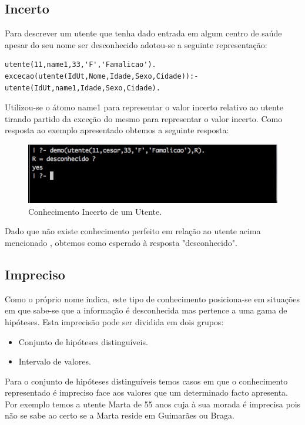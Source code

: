 \documentclass[25pt]{article}
\begin{document}
\subsection{Incerto}
Para descrever um utente que tenha dado entrada em algum centro de saúde apesar do seu nome ser desconhecido adotou-se a seguinte representação:
\begin{lstlisting}
utente(11,name1,33,'F','Famalicao').
excecao(utente(IdUt,Nome,Idade,Sexo,Cidade)):- 
utente(IdUt,name1,Idade,Sexo,Cidade).
\end{lstlisting}

Utilizou-se o átomo name1 para representar o valor incerto relativo ao utente tirando partido da exceção do mesmo para representar o valor incerto.\newline
Como resposta ao exemplo apresentado obtemos a seguinte resposta:

\begin{figure}[H]
\centering\includegraphics[scale=0.55]{incerto}
\caption{\label{fig:controller}Conhecimento Incerto de um Utente.}
\end{figure}

Dado que não existe conhecimento perfeito em relação ao utente acima mencionado , obtemos como esperado à resposta "desconhecido".


\subsection{Impreciso}
Como o próprio nome indica, este tipo de conhecimento posiciona-se em situações em que sabe-se que a informação é desconhecida mas pertence 
a uma gama de hipóteses. Esta imprecisão pode ser dividida em dois grupos:
\begin{itemize}
\item Conjunto de hipóteses distinguíveis.
\item Intervalo de valores.
\end{itemize}

Para o conjunto de hipóteses distinguíveis temos casos em que  o conhecimento representado é impreciso face aos valores que um determinado facto
apresenta.
Por exemplo temos a utente Marta de 55 anos cuja à sua morada é imprecisa pois não se sabe ao certo se a Marta reside em Guimarães ou Braga.
\end{document}
